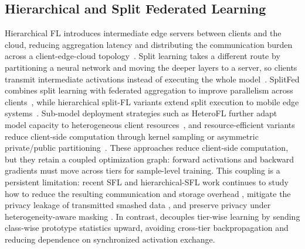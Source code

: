 \subsection{Hierarchical and Split Federated Learning}
Hierarchical FL introduces intermediate edge servers between clients and the cloud, reducing aggregation latency and distributing the communication burden across a client-edge-cloud topology~\cite{liu2020client,9488756,rana2022hierarchical}. Split learning takes a different route by partitioning a neural network and moving the deeper layers to a server, so clients transmit intermediate activations instead of executing the whole model~\cite{vepakomma2018split,GUPTA20181}. SplitFed combines split learning with federated aggregation to improve parallelism across clients~\cite{thapa2022splitfed}, while hierarchical split-FL variants extend split execution to mobile edge systems~\cite{quan2023hiersfl}. Sub-model deployment strategies such as HeteroFL further adapt model capacity to heterogeneous client resources~\cite{diao2021heterofl}, and resource-efficient variants reduce client-side computation through kernel sampling or asymmetric private/public partitioning~\cite{niu2023overcoming,10655220}. These approaches reduce client-side computation, but they retain a coupled optimization graph: forward activations and backward gradients must move across tiers for sample-level training. This coupling is a persistent limitation: recent SFL and hierarchical-SFL work continues to study how to reduce the resulting communication and storage overhead \cite{11091500,zhang2025amperecommunicationefficienthighaccuracysplit}, mitigate the privacy leakage of transmitted smashed data \cite{qiu2023evaluating}, and preserve privacy under heterogeneity-aware masking \cite{wang2025towards}. In contrast, \hsfp decouples tier-wise learning by sending class-wise prototype statistics upward, avoiding cross-tier backpropagation and reducing dependence on synchronized activation exchange.

